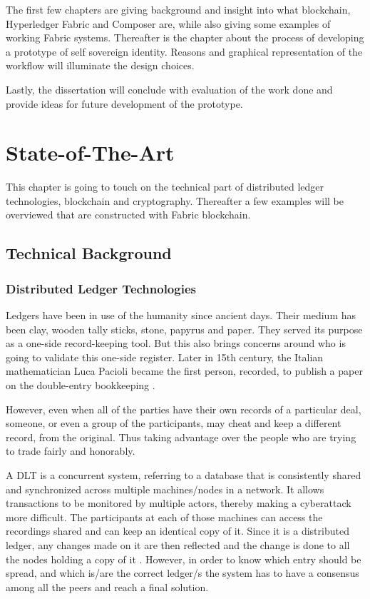 \documentclass[a4paper,11pt]{report}
\begin{document}
The first few chapters are giving background and insight into what blockchain, Hyperledger Fabric and Composer are, while also giving some examples of working Fabric systems. Thereafter is the chapter about the process of developing a prototype of self sovereign identity. Reasons and graphical representation of the workflow will illuminate the design choices. 

Lastly, the dissertation will conclude with evaluation of the work done and provide ideas for future development of the prototype.   
  



\chapter{State-of-The-Art}
\label{state}

This chapter is going to touch on the technical part of distributed ledger technologies, blockchain and cryptography. Thereafter a few examples will be overviewed that are constructed with Fabric blockchain. 
 
\section{Technical Background}
\subsection{Distributed Ledger Technologies}

\label{dlt}

Ledgers have been in use of the humanity since ancient days. Their medium has been clay, wooden tally sticks, stone, papyrus and paper. They served its purpose as a one-side record-keeping tool. But this also brings concerns around who is going to validate this one-side register. Later in 15th century, the Italian mathematician Luca Pacioli became the first person, recorded, to publish a paper on the double-entry bookkeeping \cite{ledgers}.

However, even when all of the parties have their own records of a particular deal, someone, or even a group of the participants, may cheat and keep a different record, from the original. Thus taking advantage over the people who are trying to trade fairly and honorably.

A DLT is a concurrent system, referring to a database that is consistently shared and synchronized across multiple machines/nodes in a network. It allows transactions to be monitored by multiple actors, thereby making a cyberattack more difficult. The participants at each of those machines can access the recordings shared and can keep an identical copy of it. Since it is a distributed ledger, any changes made on it are then reflected and the change is done to all the nodes holding a copy of it \cite{dltref} . However, in order to know which entry should be spread, and which is/are the correct ledger/s the system has to have a consensus among all the peers and reach a final solution.
\end{document}
